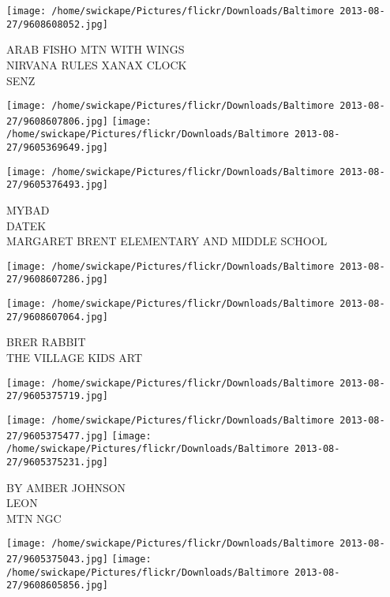 \documentclass[10pt,letterpaper]{article}
\begin{document}
\vspace{0.25in}
\texttt{[image: /home/swickape/Pictures/flickr/Downloads/Baltimore 2013-08-27/9608608052.jpg]}

ARAB FISHO MTN WITH WINGS\\
NIRVANA RULES XANAX CLOCK\\
SENZ\\
\pagebreak

\texttt{[image: /home/swickape/Pictures/flickr/Downloads/Baltimore 2013-08-27/9608607806.jpg]}
\texttt{[image: /home/swickape/Pictures/flickr/Downloads/Baltimore 2013-08-27/9605369649.jpg]}

\vspace{0.25in}
\texttt{[image: /home/swickape/Pictures/flickr/Downloads/Baltimore 2013-08-27/9605376493.jpg]}

MYBAD\\
DATEK\\
MARGARET BRENT ELEMENTARY AND MIDDLE SCHOOL\\
\pagebreak

\texttt{[image: /home/swickape/Pictures/flickr/Downloads/Baltimore 2013-08-27/9608607286.jpg]}

\vspace{0.25in}
\texttt{[image: /home/swickape/Pictures/flickr/Downloads/Baltimore 2013-08-27/9608607064.jpg]}

BRER RABBIT\\
THE VILLAGE KIDS ART\\
\pagebreak

\texttt{[image: /home/swickape/Pictures/flickr/Downloads/Baltimore 2013-08-27/9605375719.jpg]}

\vspace{0.25in}
\texttt{[image: /home/swickape/Pictures/flickr/Downloads/Baltimore 2013-08-27/9605375477.jpg]}
\texttt{[image: /home/swickape/Pictures/flickr/Downloads/Baltimore 2013-08-27/9605375231.jpg]}

BY AMBER JOHNSON\\
LEON\\
MTN NGC\\
\pagebreak

\texttt{[image: /home/swickape/Pictures/flickr/Downloads/Baltimore 2013-08-27/9605375043.jpg]}
\texttt{[image: /home/swickape/Pictures/flickr/Downloads/Baltimore 2013-08-27/9608605856.jpg]}
\end{document}

